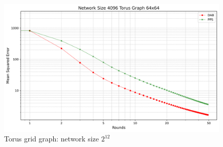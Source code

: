 \begin{figure}[H]
    \centering
    \includegraphics[scale=0.5]{figures/torusGridGraphSimulations/DAB_vs_PPS_TG_r50_n4096.png}
    \caption{Torus grid graph: network size $2^{12}$}
    \label{fig:4096torusGraph}
\end{figure}

